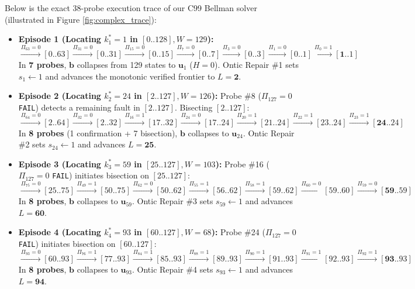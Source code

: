 \documentclass[11pt,a4paper]{article}
\theoremstyle{definition}
\theoremstyle{remark}
\begin{document}
Below is the exact 38-probe execution trace of our C99 Bellman solver (illustrated in Figure \ref{fig:complex_trace}):
\begin{itemize}
    \item \textbf{Episode 1 (Locating $k_1^* = 1$ in $[0..128], W=129$):}
    {\scriptsize
    \begin{equation*}
        [0..128] \xrightarrow{\Pi_{63}=0} [0..63] \xrightarrow{\Pi_{31}=0} [0..31] \xrightarrow{\Pi_{15}=0} [0..15] \xrightarrow{\Pi_{7}=0} [0..7] \xrightarrow{\Pi_{3}=0} [0..3] \xrightarrow{\Pi_{1}=0} [0..1] \xrightarrow{\Pi_{0}=1} \mathbf{[1..1]}
    \end{equation*}}
    In \textbf{7 probes}, $\bm{b}$ collapses from 129 states to $\bm{u}_1$ ($H=0$). Ontic Repair \#1 sets $s_1 \leftarrow 1$ and advances the monotonic verified frontier to $L = \mathbf{2}$.

    \item \textbf{Episode 2 (Locating $k_2^* = 24$ in $[2..127], W=126$):}
    Probe \#8 ($\Pi_{127} = 0$ \texttt{FAIL}) detects a remaining fault in $[2..127]$. Bisecting $[2..127]$:
    {\scriptsize
    \begin{equation*}
        [2..127] \xrightarrow{\Pi_{64}=0} [2..64] \xrightarrow{\Pi_{32}=0} [2..32] \xrightarrow{\Pi_{16}=1} [17..32] \xrightarrow{\Pi_{24}=0} [17..24] \xrightarrow{\Pi_{20}=1} [21..24] \xrightarrow{\Pi_{22}=1} [23..24] \xrightarrow{\Pi_{23}=1} \mathbf{[24..24]}
    \end{equation*}}
    In \textbf{8 probes} (1 confirmation + 7 bisection), $\bm{b}$ collapses to $\bm{u}_{24}$. Ontic Repair \#2 sets $s_{24} \leftarrow 1$ and advances $L = \mathbf{25}$.

    \item \textbf{Episode 3 (Locating $k_3^* = 59$ in $[25..127], W=103$):}
    Probe \#16 ($\Pi_{127} = 0$ \texttt{FAIL}) initiates bisection on $[25..127]$:
    {\scriptsize
    \begin{equation*}
        [25..127] \xrightarrow{\Pi_{75}=0} [25..75] \xrightarrow{\Pi_{49}=1} [50..75] \xrightarrow{\Pi_{62}=0} [50..62] \xrightarrow{\Pi_{55}=1} [56..62] \xrightarrow{\Pi_{58}=1} [59..62] \xrightarrow{\Pi_{60}=0} [59..60] \xrightarrow{\Pi_{59}=0} \mathbf{[59..59]}
    \end{equation*}}
    In \textbf{8 probes}, $\bm{b}$ collapses to $\bm{u}_{59}$. Ontic Repair \#3 sets $s_{59} \leftarrow 1$ and advances $L = \mathbf{60}$.

    \item \textbf{Episode 4 (Locating $k_4^* = 93$ in $[60..127], W=68$):}
    Probe \#24 ($\Pi_{127} = 0$ \texttt{FAIL}) initiates bisection on $[60..127]$:
    {\scriptsize
    \begin{equation*}
        [60..127] \xrightarrow{\Pi_{93}=0} [60..93] \xrightarrow{\Pi_{76}=1} [77..93] \xrightarrow{\Pi_{84}=1} [85..93] \xrightarrow{\Pi_{88}=1} [89..93] \xrightarrow{\Pi_{90}=1} [91..93] \xrightarrow{\Pi_{91}=1} [92..93] \xrightarrow{\Pi_{92}=1} \mathbf{[93..93]}
    \end{equation*}}
    In \textbf{8 probes}, $\bm{b}$ collapses to $\bm{u}_{93}$. Ontic Repair \#4 sets $s_{93} \leftarrow 1$ and advances $L = \mathbf{94}$.


\end{itemize}
\end{document}
